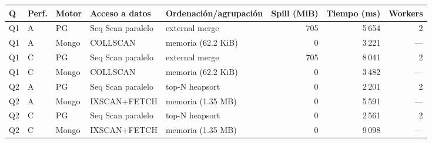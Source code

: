 \begin{tabular}{@{}lllllrrr@{}}
\toprule
Q & Perf. & Motor & Acceso a datos & Ordenación/agrupación & Spill (MiB) & Tiempo (ms) & Workers \\
\midrule
Q1 & A & PG & Seq Scan paralelo & external merge & 705 & 5\,654 & 2 \\
Q1 & A & Mongo & COLLSCAN & memoria (62.2 KiB) & 0 & 3\,221 & --- \\
Q1 & C & PG & Seq Scan paralelo & external merge & 705 & 8\,041 & 2 \\
Q1 & C & Mongo & COLLSCAN & memoria (62.2 KiB) & 0 & 3\,482 & --- \\
\addlinespace[2pt]
Q2 & A & PG & Seq Scan paralelo & top-N heapsort & 0 & 2\,201 & 2 \\
Q2 & A & Mongo & IXSCAN+FETCH & memoria (1.35 MB) & 0 & 5\,591 & --- \\
Q2 & C & PG & Seq Scan paralelo & top-N heapsort & 0 & 2\,561 & 2 \\
Q2 & C & Mongo & IXSCAN+FETCH & memoria (1.35 MB) & 0 & 9\,098 & --- \\
\bottomrule
\end{tabular}
